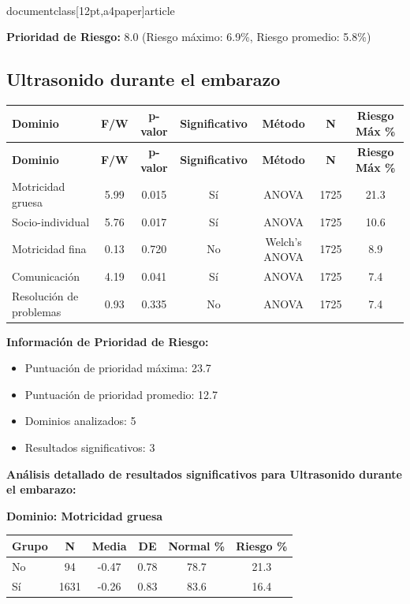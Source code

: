 \\documentclass[12pt,a4paper]{article}
\begin{document}
\textbf{Prioridad de Riesgo:} 8.0 (Riesgo máximo: 6.9\%, Riesgo promedio: 5.8\%)


\vspace{0.5cm}


\subsection{Ultrasonido durante el embarazo}


\begin{longtable}{|l|c|c|c|c|c|c|}
\hline
\textbf{Dominio} & \textbf{F/W} & \textbf{p-valor} & \textbf{Significativo} & \textbf{Método} & \textbf{N} & \textbf{Riesgo Máx \%} \\
\hline
\endfirsthead

\hline
\textbf{Dominio} & \textbf{F/W} & \textbf{p-valor} & \textbf{Significativo} & \textbf{Método} & \textbf{N} & \textbf{Riesgo Máx \%} \\
\hline
\endhead

\hline
\endfoot

\hline
\endlastfoot

Motricidad gruesa & 5.99 & 0.015 & Sí & ANOVA & 1725 & 21.3 \\
Socio-individual & 5.76 & 0.017 & Sí & ANOVA & 1725 & 10.6 \\
Motricidad fina & 0.13 & 0.720 & No & Welch's ANOVA & 1725 & 8.9 \\
Comunicación & 4.19 & 0.041 & Sí & ANOVA & 1725 & 7.4 \\
Resolución de problemas & 0.93 & 0.335 & No & ANOVA & 1725 & 7.4 \\

\end{longtable}


\textbf{Información de Prioridad de Riesgo:}
\begin{itemize}
\item Puntuación de prioridad máxima: 23.7
\item Puntuación de prioridad promedio: 12.7
\item Dominios analizados: 5
\item Resultados significativos: 3
\end{itemize}


\textbf{Análisis detallado de resultados significativos para Ultrasonido durante el embarazo:}


\textbf{Dominio: Motricidad gruesa}


\begin{center}
\begin{tabular}{|l|c|c|c|c|c|}
\hline
\textbf{Grupo} & \textbf{N} & \textbf{Media} & \textbf{DE} & \textbf{Normal \%} & \textbf{Riesgo \%} \\
\hline
No & 94 & -0.47 & 0.78 & 78.7 & 21.3 \\
Sí & 1631 & -0.26 & 0.83 & 83.6 & 16.4 \\

\hline
\end{tabular}
\end{center}
\end{document}

